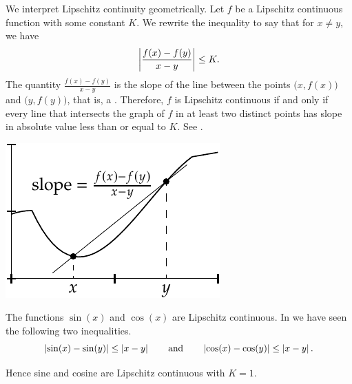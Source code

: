We interpret Lipschitz continuity geometrically.  Let $f$ be a Lipschitz
continuous function with some constant $K$.  We rewrite the inequality 
to say that for $x \not=y$, we have
\begin{equation*}
\left\lvert {\frac{f(x)-f(y)}{x-y}} \right\rvert \leq K .
\end{equation*}
The quantity $\frac{f(x)-f(y)}{x-y}$ is the slope of the line
between the points $\bigl(x,f(x)\bigr)$
and $\bigl(y,f(y)\bigr)$, that is, a \emph{}.  Therefore, $f$ is Lipschitz
continuous if and only if every line that intersects the graph of $f$ in at least two
distinct
points has slope in absolute value less than or equal to $K$.  See .
\begin{myfigureht}
\includegraphics{figures/lipschitzfig}
\caption{The slope of a secant line.
A function is Lipschitz if %
$\abs{\frac{f(x)-f(y)}{x-y}} \leq K$ for all $x$ and $y$.\label{fig:lipschitz}}
\end{myfigureht}

\begin{example}
The functions $\sin(x)$ and $\cos(x)$ are Lipschitz continuous.
In  we have seen the following two inequalities.
\begin{equation*}
\left\lvert {\sin(x)-\sin(y)} \right\rvert 
\leq \left\lvert {x-y} \right\rvert
\qquad \text{and} \qquad
\left\lvert {\cos(x)-\cos(y)} \right\rvert
\leq \left\lvert {x-y} \right\rvert .
\end{equation*}

Hence sine and cosine are Lipschitz continuous with $K=1$.
\end{example}


